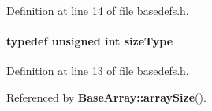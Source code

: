 Definition at line 14 of file basedefs.h.\label{basedefs.h_a10}
\paragraph{\setlength{\rightskip}{0pt plus 5cm}typedef unsigned int size\-Type}\hfill



Definition at line 13 of file basedefs.h.

Referenced by {\bf Base\-Array::array\-Size}().